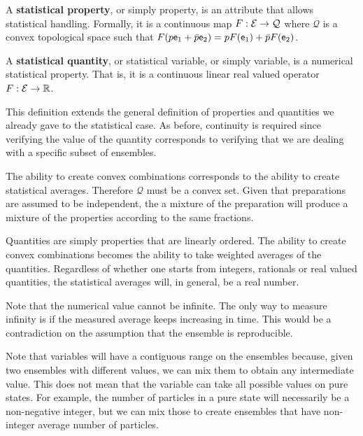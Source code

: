 \begin{defn}
	A \textbf{statistical property}, or simply property, is an attribute that allows statistical handling. Formally, it is a continuous map $F : \mathcal{E} \to \mathcal{Q}$ where $\mathcal{Q}$ is a convex topological space such that $F(p \mathsf{e}_1 + \bar{p} \mathsf{e}_2) = p F(\mathsf{e}_1) + \bar{p} F(\mathsf{e}_2)$.
	
	A \textbf{statistical quantity}, or statistical variable, or simply variable, is a numerical statistical property. That is, it is a continuous linear real valued operator $F : \mathcal{E} \to \mathbb{R}$.
\end{defn}

\begin{justification}
	This definition extends the general definition of properties and quantities we already gave to the statistical case. As before, continuity is required since verifying the value of the quantity corresponds to verifying that we are dealing with a specific subset of ensembles.
	
	The ability to create convex combinations corresponds to the ability to create statistical averages. Therefore $\mathcal{Q}$ must be a convex set. Given that preparations are assumed to be independent, the a mixture of the preparation will produce a mixture of the properties according to the same fractions. 
	
	Quantities are simply properties that are linearly ordered. The ability to create convex combinations becomes the ability to take weighted averages of the quantities. Regardless of whether one starts from integers, rationals or real valued quantities, the statistical averages will, in general, be a real number.
	
	Note that the numerical value cannot be infinite. The only way to measure infinity is if the measured average keeps increasing in time. This would be a contradiction on the assumption that the ensemble is reproducible.
\end{justification}

\begin{remark}
	Note that variables will have a contiguous range on the ensembles because, given two ensembles with different values, we can mix them to obtain any intermediate value. This does not mean that the variable can take all possible values on pure states. For example, the number of particles in a pure state will necessarily be a non-negative integer, but we can mix those to create ensembles that have non-integer average number of particles.
\end{remark}

